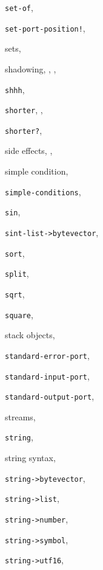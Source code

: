 {\begin{multicols}{2}
\texttt{set-of}, \pageref{examples_s15}
  
\texttt{set-port-position!}, \textit{\pageref{io_s50}}
  
sets, \pageref{examples_s16}
  
shadowing, \pageref{intro_s15}, \pageref{start_s54}, \pageref{start_s81}
  
\texttt{shhh}, \pageref{start_s169}
  
\texttt{shorter}, \pageref{start_s129}, \pageref{start_s156}
  
\texttt{shorter?}, \pageref{start_s157}
  
side effects, \pageref{intro_s52}, \pageref{control_s6}
  
simple condition, \pageref{exceptions_s12}
  
\texttt{simple-conditions}, \textit{\pageref{exceptions_s16}}
  
\texttt{sin}, \textit{\pageref{objects_s131}}
  
\texttt{sint-list-\textgreater{}bytevector}, \textit{\pageref{objects_s261}}
  
\texttt{sort}, \pageref{examples_s10}
  
\texttt{split}, \pageref{control_s76}
  
\texttt{sqrt}, \textit{\pageref{objects_s127}}
  
\texttt{square}, \pageref{start_s2}
  
stack objects, \pageref{start_s176}
  
\texttt{standard-error-port}, \textit{\pageref{io_s33}}
  
\texttt{standard-input-port}, \textit{\pageref{io_s33}}
  
\texttt{standard-output-port}, \textit{\pageref{io_s33}}
  
streams, \pageref{control_s66}
  
\texttt{string}, \textit{\pageref{objects_s217}}
  
string syntax, \pageref{grammar_s16}
  
\texttt{string-\textgreater{}bytevector}, \textit{\pageref{io_s92}}
  
\texttt{string-\textgreater{}list}, \textit{\pageref{objects_s228}}
  
\texttt{string-\textgreater{}number}, \textit{\pageref{objects_s147}}
  
\texttt{string-\textgreater{}symbol}, \textit{\pageref{objects_s269}}
  
\texttt{string-\textgreater{}utf16}, \textit{\pageref{io_s94}}
  

\end{multicols}}
